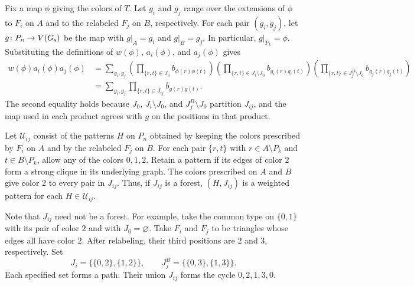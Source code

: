 \documentclass[preprint,11pt,numbers]{elsarticle-arxiv}
\numberwithin{equation}{section}
\theoremstyle{definition}
\begin{document}
Fix a map $\phi$ giving the colors of $T$. Let $g_i$ and $g_j$ range
over the extensions of $\phi$ to $F_i$ on $A$ and to the relabeled
$F_j$ on $B$, respectively. For each pair
$(g_i,g_j)$, let $g\colon P_n\to V(G_{\rm s})$ be the map with
$g|_A=g_i$ and $g|_B=g_j$. In particular, $g|_{P_k}=\phi$.
Substituting the definitions of $w(\phi)$, $a_i(\phi)$, and
$a_j(\phi)$ gives
\[
\begin{aligned}
 w(\phi)a_i(\phi)a_j(\phi)
 &=\sum_{g_i,g_j}
  \left(\prod_{\{r,t\}\in J_0} b_{\phi(r)\phi(t)}\right)
  \left(\prod_{\{r,t\}\in J_i\setminus J_0} b_{g_i(r)g_i(t)}\right)
  \left(\prod_{\{r,t\}\in J_j^B\setminus J_0} b_{g_j(r)g_j(t)}\right)\\
 &=\sum_{g_i,g_j}\prod_{\{r,t\}\in J_{ij}} b_{g(r)g(t)}.
\end{aligned}
\]
The second equality holds because $J_0$, $J_i\setminus J_0$, and
$J_j^B\setminus J_0$ partition $J_{ij}$, and the map used in each
product agrees with $g$ on the positions in that product.

Let $\mathcal U_{ij}$ consist of the patterns $H$ on $P_n$ obtained
by keeping the colors prescribed by $F_i$ on $A$ and by the relabeled
$F_j$ on $B$. For each pair $\{r,t\}$ with $r\in A\setminus P_k$
and $t\in B\setminus P_k$, allow any of the colors $0,1,2$.
Retain a pattern if its edges of color $2$ form a strong clique
in its underlying graph. The colors prescribed on $A$ and $B$
give color $2$ to every pair in $J_{ij}$. Thus, if $J_{ij}$ is a
forest, $(H,J_{ij})$ is a weighted pattern for each
$H\in\mathcal U_{ij}$.

Note that $J_{ij}$ need not be a forest. For example, take the
common type on $\{0,1\}$ with its pair of color $2$ and with
$J_0=\varnothing$. Take $F_i$ and $F_j$ to be triangles whose edges
all have color $2$. After relabeling, their third positions are
$2$ and $3$, respectively. Set
\[
 J_i=\bigl\{\{0,2\},\{1,2\}\bigr\},
 \qquad J_j^B=\bigl\{\{0,3\},\{1,3\}\bigr\}.
\]
Each specified set forms a path. Their union $J_{ij}$ forms the
cycle $0,2,1,3,0$.
\end{document}
